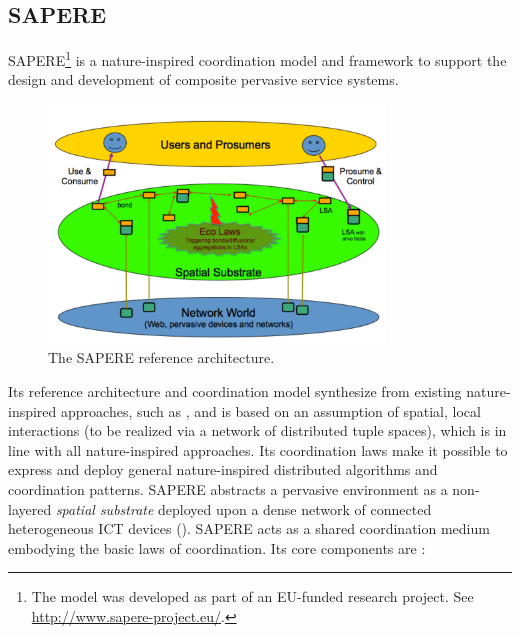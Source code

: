 \documentclass[12pt,a4paper,twoside,openright]{book}
\begin{document}
\subsection{SAPERE}
SAPERE\footnote{The model was developed as part of an EU-funded research project. See \url{http://www.sapere-project.eu/}.} \cite{sapere-procedia7} is a nature-inspired coordination model and framework to support the design and development of composite pervasive service systems.
\begin{figure}
\centering
\includegraphics[width=0.8\textwidth]{img/architecture_2.pdf}
\caption[SAPERE reference architecture]{The SAPERE reference architecture.}
\label{img:sapere-architecture}
\end{figure}
%
Its reference architecture and coordination model synthesize from existing nature-inspired approaches, such as \cite{biochemicalTupleSpaces, frameworkSelfOrg, VCMZ-TAAS2011, wordNet}, and is based on an assumption of spatial, local interactions (to be realized via a network of distributed tuple spaces), which is in line with all nature-inspired approaches.
%
Its coordination laws make it possible to express and deploy general nature-inspired distributed algorithms and coordination patterns.
%
SAPERE abstracts a pervasive environment as a non-layered \emph{spatial substrate} deployed upon a dense network of connected heterogeneous ICT devices ().
%
SAPERE acts as a shared coordination medium embodying the basic laws of coordination.
%
Its core components are \cite{sapereecolaws-sac2012}:
\end{document}
